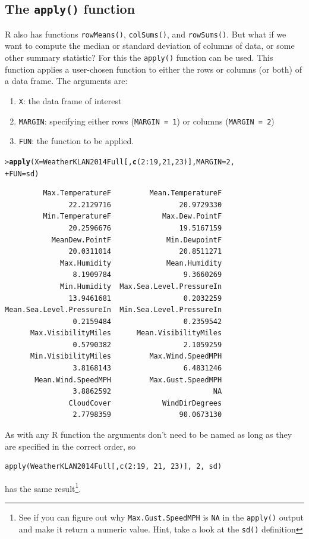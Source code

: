 \documentclass[12pt,oneside]{book}\usepackage[]{graphicx}\usepackage[]{color}
\makeatletter
\newcommand{\hlnum}[1]{\textcolor[rgb]{0.686,0.059,0.569}{#1}}%
\newcommand{\hlopt}[1]{\textcolor[rgb]{0,0,0}{#1}}%
\newcommand{\hlstd}[1]{\textcolor[rgb]{0.345,0.345,0.345}{#1}}%
\newcommand{\hlkwc}[1]{\textcolor[rgb]{0.333,0.667,0.333}{#1}}%
\newcommand{\hlkwd}[1]{\textcolor[rgb]{0.737,0.353,0.396}{\textbf{#1}}}%
\newenvironment{kframe}{%
 \def\at@end@of@kframe{}%
 \ifinner\ifhmode%
  \def\at@end@of@kframe{\end{minipage}}%
  \begin{minipage}{\columnwidth}%
 \fi\fi%
 \def\FrameCommand##1{\hskip\@totalleftmargin \hskip-\fboxsep
 \colorbox{shadecolor}{##1}\hskip-\fboxsep
     \hskip-\linewidth \hskip-\@totalleftmargin \hskip\columnwidth}%
 \MakeFramed {\advance\hsize-\width
   \@totalleftmargin\z@ \linewidth\hsize
   \@setminipage}}%
 {\par\unskip\endMakeFramed%
 \at@end@of@kframe}
\newenvironment{knitrout}{}{} %
\newcommand{\be}{\begin{enumerate}}
\newcommand{\ee}{\end{enumerate}}
\makeatother
\begin{document}
\subsection{The \texttt{apply()} function}\label{SEC:APPLY}
R also has functions \verb+rowMeans()+, \verb+colSums()+, and \verb+rowSums()+. But what if we want to compute the median or standard deviation of columns of data, or some other summary statistic? For this the \verb+apply()+ function can be used. This function applies a user-chosen function to either the rows or columns (or both) of a data frame. The arguments are:
\be
\item \verb+X+: the data frame of interest
\item \verb+MARGIN+: specifying either rows (\verb+MARGIN = 1+) or columns (\verb+MARGIN = 2+)
\item \verb+FUN+: the function to be applied.
\ee
\begin{knitrout}
\color{fgcolor}\begin{kframe}
\begin{alltt}
\hlstd{> }\hlkwd{apply}\hlstd{(}\hlkwc{X} \hlstd{= WeatherKLAN2014Full[,} \hlkwd{c}\hlstd{(}\hlnum{2}\hlopt{:}\hlnum{19}\hlstd{,} \hlnum{21}\hlstd{,} \hlnum{23}\hlstd{)],} \hlkwc{MARGIN} \hlstd{=} \hlnum{2}\hlstd{,}
\hlstd{+ }    \hlkwc{FUN} \hlstd{= sd)}
\end{alltt}
\begin{verbatim}
         Max.TemperatureF         Mean.TemperatureF 
               22.2129716                20.9729330 
         Min.TemperatureF            Max.Dew.PointF 
               20.2596676                19.5167159 
           MeanDew.PointF             Min.DewpointF 
               20.0311014                20.8511271 
             Max.Humidity             Mean.Humidity 
                8.1909784                 9.3660269 
             Min.Humidity  Max.Sea.Level.PressureIn 
               13.9461681                 0.2032259 
Mean.Sea.Level.PressureIn  Min.Sea.Level.PressureIn 
                0.2159484                 0.2359542 
      Max.VisibilityMiles      Mean.VisibilityMiles 
                0.5790382                 2.1059259 
      Min.VisibilityMiles         Max.Wind.SpeedMPH 
                3.8168143                 6.4831246 
       Mean.Wind.SpeedMPH         Max.Gust.SpeedMPH 
                3.8862592                        NA 
               CloudCover            WindDirDegrees 
                2.7798359                90.0673130 
\end{verbatim}
\end{kframe}
\end{knitrout}
As with any R function the arguments don't need to be named as long as they are specified in the correct order, so 
\begin{verbatim}
apply(WeatherKLAN2014Full[,c(2:19, 21, 23)], 2, sd)
\end{verbatim}
has the same result\footnote{See if you can figure out why \texttt{Max.Gust.SpeedMPH} is \texttt{NA} in the \texttt{apply()} output and make it return a numeric value. Hint, take a look at the \texttt{sd()} definition}.
\end{document}
